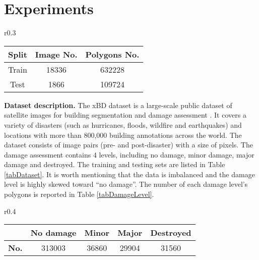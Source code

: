 \documentclass{article}
\begin{document}
\section{Experiments}
\begin{wraptable}{r}{0.3\textwidth}
\vspace{-\intextsep}
\footnotesize
  \caption{xBD dataset splits and annotation numbers.}
  \vspace{-0.3cm}
  \label{tabDataset}
  \begin{center}
  \setlength\tabcolsep{2.0pt} 
  \renewcommand{\arraystretch}{0.8}\begin{tabular}{ccc}
    \toprule
    {Split}     & {Image No.}     & {Polygons No.} \\
    \midrule
    Train & 18336  &  632228     \\
    Test    & 1866  & 109724     \\
    \bottomrule
  \end{tabular}
  \vspace{-0.3cm}
  \end{center}
\end{wraptable}
\textbf{Dataset description.} The xBD dataset is a large-scale public dataset of satellite images for building segmentation and damage assessment \cite{gupta2019xbd}. It covers a variety of disasters (such as hurricanes, floods, wildfire and earthquakes) and locations with more than 800,000 building annotations across the world. The dataset consists of image pairs (pre- and post-disaster) with a size of  pixels. The damage assessment contains 4 levels, including no damage, minor damage, major damage and destroyed. The training and testing sets are listed in Table \ref{tabDataset}. It is worth mentioning that the data is imbalanced and the damage level is highly skewed toward ``no damage''. The number of each damage level's polygons is reported in Table \ref{tabDamageLevel}.
\begin{wraptable}{r}{0.4\textwidth}
\vspace{-\intextsep}
\footnotesize
  \caption{Damage level annotations.}
  \vspace{-0.3cm}
  \begin{center}
  \setlength\tabcolsep{2.0pt} 
  \renewcommand{\arraystretch}{0.7}\begin{tabular}{ccccc}
    \toprule
    \textbf{}     & No damage    & Minor & Major & Destroyed \\
    \midrule
   \textbf{No.} & 313003  &  36860    & 29904 & 31560 \\
    \bottomrule
  \end{tabular}
  \vspace{-0.3cm}
  \end{center}
    \label{tabDamageLevel}
\end{wraptable}
\end{document}
